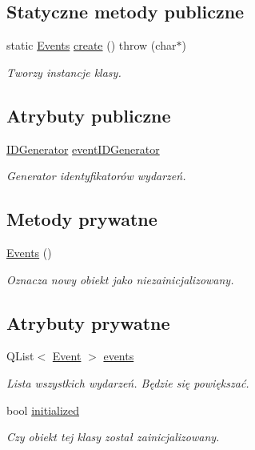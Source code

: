 \subsection*{Statyczne metody publiczne}
\begin{DoxyCompactItemize}
\item 
static \hyperlink{classEvents}{Events} \hyperlink{classEvents_ac4ccb0fd05c7bc876b95cf6cdd549666}{create} ()  throw (char$\ast$)
\begin{DoxyCompactList}\small\item\em Tworzy instancje klasy. \item\end{DoxyCompactList}\end{DoxyCompactItemize}
\subsection*{Atrybuty publiczne}
\begin{DoxyCompactItemize}
\item 
\hyperlink{classIDGenerator}{IDGenerator} \hyperlink{classEvents_aee8768258412e3f8d298a539e038169c}{eventIDGenerator}
\begin{DoxyCompactList}\small\item\em Generator identyfikatorów wydarzeń. \item\end{DoxyCompactList}\end{DoxyCompactItemize}
\subsection*{Metody prywatne}
\begin{DoxyCompactItemize}
\item 
\hyperlink{classEvents_aab651428bab6b09db3564753afb225a6}{Events} ()
\begin{DoxyCompactList}\small\item\em Oznacza nowy obiekt jako niezainicjalizowany. \item\end{DoxyCompactList}\end{DoxyCompactItemize}
\subsection*{Atrybuty prywatne}
\begin{DoxyCompactItemize}
\item 
QList$<$ \hyperlink{classEvent}{Event} $>$ \hyperlink{classEvents_a38bc398f90e69e671e7411bf73cf3fc0}{events}
\begin{DoxyCompactList}\small\item\em Lista wszystkich wydarzeń. Będzie się powiększać. \item\end{DoxyCompactList}\item 
bool \hyperlink{classEvents_a155926e71d11323e83ceb574177b01cb}{initialized}
\begin{DoxyCompactList}\small\item\em Czy obiekt tej klasy został zainicjalizowany. \item\end{DoxyCompactList}\end{DoxyCompactItemize}
